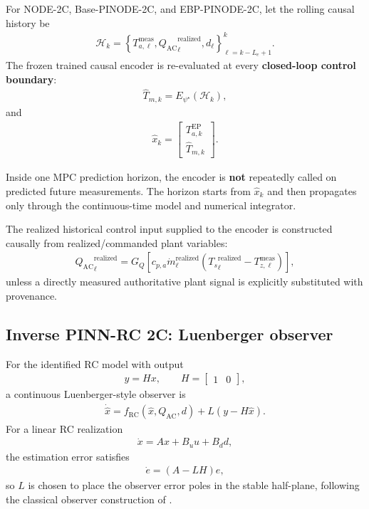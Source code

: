 \documentclass[11pt]{article}
\newcommand{\Ts}{T_s}
\newcommand{\mdot}{\dot m}
\newcommand{\QAC}{Q_{\mathrm{AC}}}
\begin{document}
For NODE-2C, Base-PINODE-2C, and EBP-PINODE-2C, let the rolling causal history be
\begin{align}
\mathcal H_k
=
\left\{
T_{a,\ell}^{\mathrm{meas}},
{\QAC}_{\ell}^{\mathrm{realized}},
d_\ell
\right\}_{\ell=k-L_e+1}^{k}.
\tag{6.48}
\end{align}
The frozen trained causal encoder is re-evaluated at every \textbf{closed-loop control boundary}:
\begin{align}
\boxed{
\widehat T_{m,k}
=
E_{\psi^\star}(\mathcal H_k),
}
\tag{6.49}
\end{align}
and
\begin{align}
\boxed{
\widehat x_k
=
\begin{bmatrix}
T_{a,k}^{\mathrm{EP}}\\
\widehat T_{m,k}
\end{bmatrix}.
}
\tag{6.50}
\end{align}

Inside one MPC prediction horizon, the encoder is \textbf{not} repeatedly called on predicted
future measurements.  The horizon starts from \(\widehat x_k\) and then propagates only through
the continuous-time model and numerical integrator.

The realized historical control input supplied to the encoder is constructed causally from
realized/commanded plant variables:
\begin{align}
{\QAC}_{\ell}^{\mathrm{realized}}
=
G_Q
\left[
c_{p,a}
\mdot_{\ell}^{\mathrm{realized}}
\left(
{\Ts}_{\ell}^{\mathrm{realized}}
-
T_{z,\ell}^{\mathrm{meas}}
\right)
\right],
\tag{6.51}
\end{align}
unless a directly measured authoritative plant signal is explicitly substituted with provenance.

\subsection{Inverse PINN-RC 2C: Luenberger observer}

For the identified RC model with output
\begin{align}
y=Hx,
\qquad
H=
\begin{bmatrix}
1&0
\end{bmatrix},
\tag{6.52}
\end{align}
a continuous Luenberger-style observer is
\begin{align}
\boxed{
\dot{\widehat x}
=
f_{\mathrm{RC}}(\widehat x,\QAC,d)
+
L
\left(
y-H\widehat x
\right).
}
\tag{6.53}
\end{align}
For a linear RC realization
\begin{align}
\dot x=Ax+B_u u+B_dd,
\end{align}
the estimation error satisfies
\begin{align}
\dot e=(A-LH)e,
\tag{6.54}
\end{align}
so \(L\) is chosen to place the observer error poles in the stable half-plane, following the
classical observer construction of \citet{luenberger1966observer}.
\end{document}
